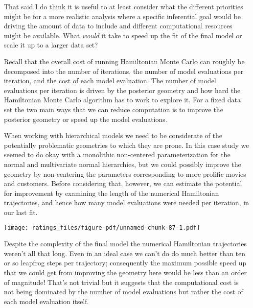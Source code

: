 \documentclass[
  letterpaper,
  DIV=11,
  numbers=noendperiod]{scrartcl}
\newenvironment{Shaded}{\begin{snugshade}}{\end{snugshade}}
\newcommand{\FunctionTok}[1]{\textcolor[rgb]{0.28,0.35,0.67}{#1}}
\newcommand{\NormalTok}[1]{\textcolor[rgb]{0.00,0.23,0.31}{#1}}
\newcommand{\SpecialCharTok}[1]{\textcolor[rgb]{0.37,0.37,0.37}{#1}}
\begin{document}
That said I do think it is useful to at least consider what the
different priorities might be for a more realistic analysis where a
specific inferential goal would be driving the amount of data to include
and different computational resources might be available. What
\emph{would} it take to speed up the fit of the final model or scale it
up to a larger data set?

Recall that the overall cost of running Hamiltonian Monte Carlo can
roughly be decomposed into the number of iterations, the number of model
evaluations per iteration, and the cost of each model evaluation. The
number of model evaluations per iteration is driven by the posterior
geometry and how hard the Hamiltonian Monte Carlo algorithm has to work
to explore it. For a fixed data set the two main ways that we can reduce
computation is to improve the posterior geometry or speed up the model
evaluations.

When working with hierarchical models we need to be considerate of the
potentially problematic geometries to which they are prone. In this case
study we seemed to do okay with a monolithic non-centered
parameterization for the normal and multivariate normal hierarchies, but
we could possibly improve the geometry by non-centering the parameters
corresponding to more prolific movies and customers. Before considering
that, however, we can estimate the potential for improvement by
examining the length of the numerical Hamiltonian trajectories, and
hence how many model evaluations were needed per iteration, in our last
fit.

\begin{Shaded}
\end{Shaded}

\texttt{[image: ratings\_files/figure-pdf/unnamed-chunk-87-1.pdf]}

Despite the complexity of the final model the numerical Hamiltonian
trajectories weren't all that long. Even in an ideal case we can't do do
much better than ten or so leapfrog steps per trajectory; consequently
the maximum possible speed up that we could get from improving the
geometry here would be less than an order of magnitude! That's not
trivial but it suggests that the computational cost is not being
dominated by the number of model evaluations but rather the cost of each
model evaluation itself.
\end{document}
